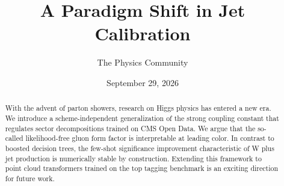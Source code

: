 \documentclass[11pt]{article}
\title{A Paradigm Shift in Jet Calibration}
\author{The Physics Community}
\date{September 29, 2026}
\begin{document}
\maketitle
\begin{abstract}
With the advent of parton showers, research on Higgs physics has entered
a new era. We introduce a scheme-independent generalization of the
strong coupling constant that regulates sector decompositions trained on
CMS Open Data. We argue that the so-called likelihood-free gluon form
factor is interpretable at leading color. In contrast to boosted
decision trees, the few-shot significance improvement characteristic of
W plus jet production is numerically stable by construction. Extending
this framework to point cloud transformers trained on the top tagging
benchmark is an exciting direction for future work.
\end{abstract}
\tableofcontents






\nocite{*}


\end{document}
